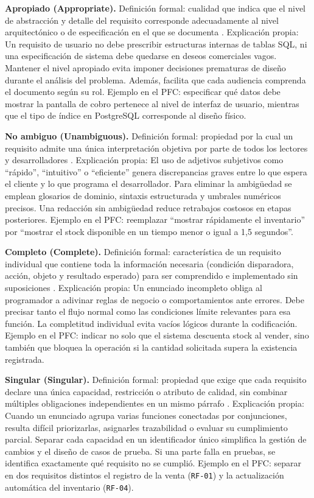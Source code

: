 \documentclass[onecolumn,12pt,a4paper]{IEEEtran}
\begin{document}
	\textbf{Apropiado (Appropriate).} Definici\'on formal: cualidad que indica que el nivel de abstracci\'on y detalle del requisito corresponde adecuadamente al nivel arquitect\'onico o de especificaci\'on en el que se documenta \cite{iso29148}. Explicaci\'on propia: Un requisito de usuario no debe prescribir estructuras internas de tablas SQL, ni una especificaci\'on de sistema debe quedarse en deseos comerciales vagos. Mantener el nivel apropiado evita imponer decisiones prematuras de dise\~no durante el an\'alisis del problema. Adem\'as, facilita que cada audiencia comprenda el documento seg\'un su rol. Ejemplo en el PFC: especificar qu\'e datos debe mostrar la pantalla de cobro pertenece al nivel de interfaz de usuario, mientras que el tipo de \'indice en PostgreSQL corresponde al dise\~no f\'isico.

	\textbf{No ambiguo (Unambiguous).} Definici\'on formal: propiedad por la cual un requisito admite una \'unica interpretaci\'on objetiva por parte de todos los lectores y desarrolladores \cite{iso29148,pohl2025,ireb2023}. Explicaci\'on propia: El uso de adjetivos subjetivos como ``r\'apido'', ``intuitivo'' o ``eficiente'' genera discrepancias graves entre lo que espera el cliente y lo que programa el desarrollador. Para eliminar la ambig\"uedad se emplean glosarios de dominio, sintaxis estructurada y umbrales num\'ericos precisos. Una redacci\'on sin ambig\"uedad reduce retrabajos costosos en etapas posteriores. Ejemplo en el PFC: reemplazar ``mostrar r\'apidamente el inventario'' por ``mostrar el stock disponible en un tiempo menor o igual a 1,5 segundos''.

	\textbf{Completo (Complete).} Definici\'on formal: caracter\'istica de un requisito individual que contiene toda la informaci\'on necesaria (condici\'on disparadora, acci\'on, objeto y resultado esperado) para ser comprendido e implementado sin suposiciones \cite{iso29148,pohl2025}. Explicaci\'on propia: Un enunciado incompleto obliga al programador a adivinar reglas de negocio o comportamientos ante errores. Debe precisar tanto el flujo normal como las condiciones l\'imite relevantes para esa funci\'on. La completitud individual evita vac\'ios l\'ogicos durante la codificaci\'on. Ejemplo en el PFC: indicar no solo que el sistema descuenta stock al vender, sino tambi\'en que bloquea la operaci\'on si la cantidad solicitada supera la existencia registrada.

	\textbf{Singular (Singular).} Definici\'on formal: propiedad que exige que cada requisito declare una \'unica capacidad, restricci\'on o atributo de calidad, sin combinar m\'ultiples obligaciones independientes en un mismo p\'arrafo \cite{iso29148,mavin2009}. Explicaci\'on propia: Cuando un enunciado agrupa varias funciones conectadas por conjunciones, resulta dif\'icil priorizarlas, asignarles trazabilidad o evaluar su cumplimiento parcial. Separar cada capacidad en un identificador \'unico simplifica la gesti\'on de cambios y el dise\~no de casos de prueba. Si una parte falla en pruebas, se identifica exactamente qu\'e requisito no se cumpli\'o. Ejemplo en el PFC: separar en dos requisitos distintos el registro de la venta (\texttt{RF-01}) y la actualizaci\'on autom\'atica del inventario (\texttt{RF-04}).
\end{document}
